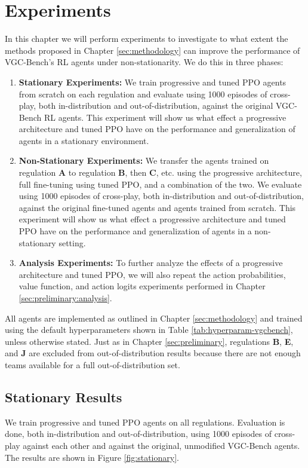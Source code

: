 %
%
\chapter{Experiments} \label{sec:experiments}
In this chapter we will perform experiments to investigate to what extent the methods proposed in Chapter \ref{sec:methodology} can improve the performance of VGC-Bench's RL agents under non-stationarity.
We do this in three phases:

\begin{enumerate}
    \item \textbf{Stationary Experiments:} We train progressive and tuned PPO agents from scratch on each regulation and evaluate using 1000 episodes of cross-play, both in-distribution and out-of-distribution, against the original VGC-Bench RL agents. This experiment will show us what effect a progressive architecture and tuned PPO have on the performance and generalization of agents in a stationary environment.
    \item \textbf{Non-Stationary Experiments:} We transfer the agents trained on regulation \textbf{A} to regulation \textbf{B}, then \textbf{C}, etc. using the progressive architecture, full fine-tuning using tuned PPO, and a combination of the two. We evaluate using 1000 episodes of cross-play, both in-distribution and out-of-distribution, against the original fine-tuned agents and agents trained from scratch. This experiment will show us what effect a progressive architecture and tuned PPO have on the performance and generalization of agents in a non-stationary setting.
    \item \textbf{Analysis Experiments:} To further analyze the effects of a progressive architecture and tuned PPO, we will also repeat the action probabilities, value function, and action logits experiments performed in Chapter \ref{sec:preliminary:analysis}.
\end{enumerate}

All agents are implemented as outlined in Chapter \ref{sec:methodology} and trained using the default hyperparameters shown in Table \ref{tab:hyperparam-vgcbench}, unless otherwise stated.
Just as in Chapter \ref{sec:preliminary}, regulations \textbf{B}, \textbf{E}, and \textbf{J} are excluded from out-of-distribution results because there are not enough teams available for a full out-of-distribution set.

\section{Stationary Results} \label{sec:results:stationary}
We train progressive and tuned PPO agents on all regulations.
Evaluation is done, both in-distribution and out-of-distribution, using 1000 episodes of cross-play against each other and against the original, unmodified VGC-Bench agents.
The results are shown in Figure \ref{fig:stationary}.

